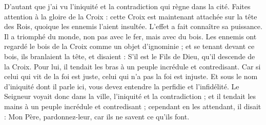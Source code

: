 D’autant que j’ai vu l’iniquité et la contradiction qui règne dans la cité. Faites attention à la gloire de la Croix : cette Croix est maintenant attachée sur la tête des Rois, quoique les ennemis l’aient insultée.
L’effet a fait connaître sa puissance. Il a triomphé du monde, non pas avec le fer, mais avec du bois. Les ennemis ont regardé le bois de la Croix comme un objet d’ignominie ; et se tenant devant ce bois, ils branlaient la tête, et disaient : S’il est le Fils de Dieu, qu’il descende de la Croix.
Pour lui, il tendait les bras à un peuple incrédule et contredisant. Car si celui qui vit de la foi est juste, celui qui n’a pas la foi est injuste. Et sous le nom d’iniquité dont il parle ici, vous devez entendre la perfidie et l’infidélité. Le Seigneur voyait donc dans la ville, l’iniquité et la contradiction ; et il tendait les mains à un peuple incrédule et contredisant ; cependant en les attendant, il disait : Mon Père, pardonnez-leur, car ils ne savent ce qu’ils font.